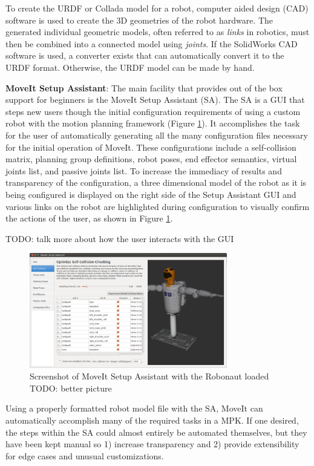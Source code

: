 \documentclass[10pt,journal,compsoc]{joser1}
\begin{document}
{To create the URDF or Collada model for a robot, computer aided design (CAD) software is used to create the 3D geometries of the robot hardware. The generated individual geometric models, often referred to as \textit{links} in robotics, must then be combined into a connected model using \textit{joints}. If the SolidWorks CAD software is used, a converter exists that can automatically convert it to the URDF format. Otherwise, the URDF model can be made by hand.

{\bf MoveIt Setup Assistant}: The main facility that provides out of the box support for beginners is the MoveIt Setup Assistant (SA). The SA is a GUI that steps new users though the initial configuration requirements of using a custom robot with the motion planning framework (Figure \ref{fig:setupassistant}). It accomplishes the task for the user of automatically generating all the many configuration files necessary for the initial operation of MoveIt. These configurations include a self-collision matrix, planning group definitions, robot poses, end effector semantics, virtual joints list, and passive joints list. To increase the immediacy of results and transparency of the configuration, a three dimensional model of the robot as it is being configured is displayed on the right side of the Setup Assistant GUI and various links on the robot are highlighted during configuration to visually confirm the actions of the user, as shown in Figure \ref{fig:setupassistant}.

TODO: talk more about how the user interacts with the GUI

\begin{figure}[!t]
\centering
\includegraphics[width=3.4in]{images/setup_assistant}
\caption{Screenshot of MoveIt Setup Assistant with the Robonaut loaded TODO: better picture}
\label{fig:setupassistant}
\end{figure}

Using a properly formatted robot model file with the SA, MoveIt can automatically accomplish many of the required tasks in a MPK. If one desired, the steps within the SA could almost entirely be automated themselves, but they have been kept manual so 1) increase transparency and 2) provide extensibility for edge cases and unusual customizations.

}
\end{document}

